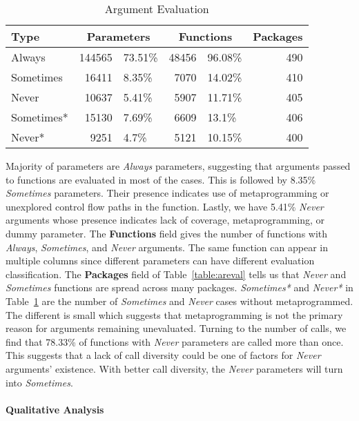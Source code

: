 \documentclass[review,nonacm,screen,acmsmall,anonymous=true]{acmart}
\newcommand{\always}{\emph{Always}\xspace}
\newcommand{\sometimes}{\emph{Sometimes}\xspace}
\newcommand{\sometimesStar}{\emph{Sometimes*}\xspace}
\newcommand{\never}{\emph{Never}\xspace}
\newcommand{\neverStar}{\emph{Never*}\xspace}
\begin{document}
\begin{table}[!h]
  \vspace{-3mm}
  \caption{Argument Evaluation}\label{table:argeval}
  \vspace{-3mm}
  \begin{tabular}{lr|lr|lr}
    \toprule
    \textbf{Type}&\multicolumn{2}{c}{\textbf{Parameters}}&\multicolumn{2}{c}{\textbf{Functions}}&\textbf{Packages}\\
    \midrule
    Always&144565&73.51\%&48456&96.08\%&490\\
    Sometimes&16411&8.35\%&7070&14.02\%&410\\
    Never&10637&5.41\%&5907&11.71\%&405\\
    \midrule
    Sometimes*&15130&7.69\%&6609&13.1\%&406\\
    Never*&9251&4.7\%&5121&10.15\%&400\\
    \bottomrule
  \end{tabular}
\end{table}

Majority of parameters are \always parameters, suggesting that arguments passed
to functions are evaluated in most of the cases. This is followed by 8.35\%
\sometimes parameters. Their presence indicates use of metaprogramming or
unexplored control flow paths in the function. Lastly, we have 5.41\% \never
arguments whose presence indicates lack of coverage, metaprogramming, or dummy
parameter. The \textbf{Functions} field gives the number of functions with
\always, \sometimes, and \never arguments. The same function can appear in
multiple columns since different parameters can have different evaluation
classification. The \textbf{Packages} field of Table~\ref{table:areval} tells us
that \never and \sometimes functions are spread across many packages.
%
\sometimesStar and \neverStar in Table~\ref{table:argeval} are the number of
\sometimes and \never cases without metaprogrammed. The different is small which
suggests that metaprogramming is not the primary reason for arguments remaining
unevaluated. Turning to the number of calls, we find that 78.33\% of functions
with \never parameters are called more than once. This suggests that a lack of
call diversity could be one of factors for \never arguments' existence. With
better call diversity, the \never parameters will turn into \sometimes.

\paragraph{Qualitative Analysis}
\end{document}

